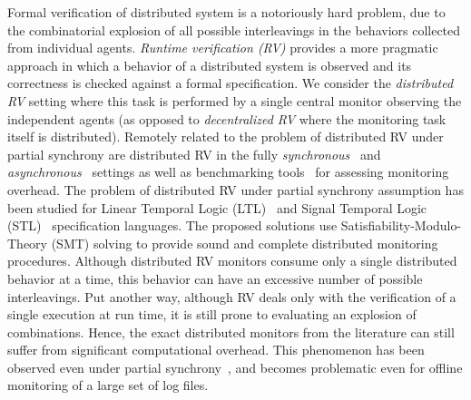 Formal verification of distributed system is a notoriously hard problem, due to the combinatorial 
explosion of all possible interleavings in the behaviors collected from individual agents.
%
 \emph{Runtime verification (RV)} provides a more pragmatic approach in which a behavior of a distributed system is observed and its correctness is checked against a formal specification.
%
We consider the \emph{distributed RV} setting where this task is performed by a single central monitor observing the independent agents (as opposed to \emph{decentralized RV} where the monitoring task itself is distributed).
%
Remotely related to the problem of distributed RV under partial synchrony are distributed RV in the 
fully {\em synchronous}~\cite{ef20,cf16,bf16} and {\em 
asynchronous}~\cite{cgnm13,mg05,og07,mb15,g20,bfrrt22} settings as well as  benchmarking 
tools~\cite{aafi21} for assessing monitoring overhead.
%
The problem of distributed RV under partial synchrony assumption has been studied for Linear 
 Temporal Logic (LTL)~\cite{GangulyMB20} and Signal Temporal Logic (STL)~\cite{MomtazAB23} 
 specification languages.
 The proposed solutions use Satisfiability-Modulo-Theory (SMT) solving to provide sound and 
 complete distributed monitoring procedures.
 Although distributed RV monitors consume only a single distributed behavior at a time, this behavior 
 can have an excessive number of possible interleavings. 
 Put another way, although RV deals only with the verification of a single execution at run time, it is 
 still prone to evaluating an explosion of combinations.
 Hence, the exact distributed monitors from the literature can still suffer from significant 
 computational overhead.
 This phenomenon has been observed even under partial synchrony~\cite{GangulyMB20,gmb24}, and becomes problematic even for offline monitoring of a large set of log files.
  

